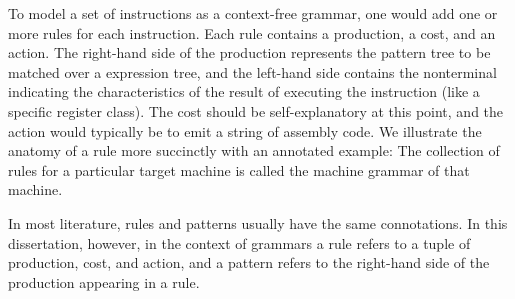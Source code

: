 {To model a set of \glspl{instruction} as a \gls{context-free grammar}, one would
add one or more \glspl{rule} for each \gls{instruction}.
%
Each rule
contains a \gls{production}, a cost, and an \gls{action}.
%
The right-hand side of
the \gls{production} represents the \gls{pattern tree} to be matched over a
\gls{expression tree}, and the left-hand side contains the \gls{nonterminal}
indicating the characteristics of the result of executing the \gls{instruction}
(like a specific \gls{register class}).
%
The cost should be self-explanatory at
this point, and the \gls{action} would typically be to emit a string of
\gls{assembly code}.
%
We illustrate the anatomy of a \gls{rule} more succinctly
with an annotated example:%
The collection of \glspl{rule} for a particular \gls{target machine} is called
the \gls{machine grammar} of that machine.

 In most literature, \glspl{rule} and \glspl{pattern}
usually have the same connotations.
%
In this dissertation, however, in the context of
\glspl{grammar} a \gls{rule} refers to a tuple of \gls{production}, cost, and
\gls{action}, and a \gls{pattern} refers to the right-hand side of the
\gls{production} appearing in a \gls{rule}.


}
